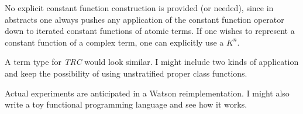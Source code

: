 \documentclass{article}
\begin{document}
No explicit constant function construction is provided (or needed),
since in abstracts one always pushes any application of the constant
function operator down to iterated constant functions of atomic terms.
If one wishes to represent a constant function of a complex term, one
can explicitly use a $K^n$.

A term type for {\em TRC\/} would look similar.  I might include two kinds
of application and keep the possibility of using unstratified proper class
functions.

Actual experiments are anticipated in a Watson reimplementation.  I might also
write a toy functional programming language and see how it works.
\end{document}
